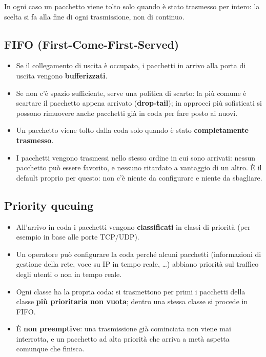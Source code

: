 In ogni caso un pacchetto viene tolto solo quando è stato trasmesso per intero: la scelta si fa alla fine di ogni
trasmissione, non di continuo.

\subsection{FIFO (First-Come-First-Served)}

\begin{itemize}
    \item Se il collegamento di uscita è occupato, i pacchetti in arrivo alla porta di uscita vengono \textbf{bufferizzati}.
    \item Se non c'è spazio sufficiente, serve una politica di scarto: la più comune è scartare il pacchetto appena arrivato
          (\textbf{drop-tail}); in approcci più sofisticati si possono rimuovere anche pacchetti già in coda per fare posto ai nuovi.
    \item Un pacchetto viene tolto dalla coda solo quando è stato \textbf{completamente trasmesso}.
    \item I pacchetti vengono trasmessi nello stesso ordine in cui sono arrivati: nessun pacchetto può essere favorito, e
          nessuno ritardato a vantaggio di un altro. È il default proprio per questo: non c'è niente da configurare e niente
          da sbagliare.
\end{itemize}

\subsection{Priority queuing}

\begin{itemize}
    \item All'arrivo in coda i pacchetti vengono \textbf{classificati} in classi di priorità (per esempio in base alle porte TCP/UDP).
    \item Un operatore può configurare la coda perché alcuni pacchetti (informazioni di gestione della rete, voce su IP in
          tempo reale, \dots) abbiano priorità sul traffico degli utenti o non in tempo reale.
    \item Ogni classe ha la propria coda: si trasmettono per primi i pacchetti della classe \textbf{più prioritaria non vuota};
          dentro una stessa classe si procede in FIFO.
    \item È \textbf{non preemptive}: una trasmissione già cominciata non viene mai interrotta, e un pacchetto ad alta
          priorità che arriva a metà aspetta comunque che finisca.
\end{itemize}

